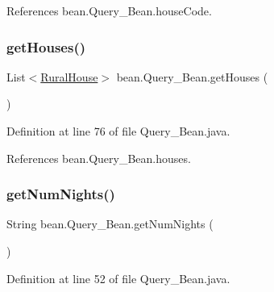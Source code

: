References bean.\+Query\+\_\+\+Bean.\+house\+Code.

\mbox{\label{classbean_1_1Query__Bean_aefdbf74a5f2ddbf5b047f5ad56245de5}} 
\subsubsection{\texorpdfstring{getHouses()}{getHouses()}}
{\footnotesize\ttfamily List$<$\mbox{\hyperlink{classdomain_1_1RuralHouse}{Rural\+House}}$>$ bean.\+Query\+\_\+\+Bean.\+get\+Houses (\begin{DoxyParamCaption}{ }\end{DoxyParamCaption})}



Definition at line 76 of file Query\+\_\+\+Bean.\+java.


\begin{DoxyCode}{0}

\end{DoxyCode}


References bean.\+Query\+\_\+\+Bean.\+houses.

\mbox{\label{classbean_1_1Query__Bean_ab979d29b59d31df3848b6a2420cbbc70}} 
\subsubsection{\texorpdfstring{getNumNights()}{getNumNights()}}
{\footnotesize\ttfamily String bean.\+Query\+\_\+\+Bean.\+get\+Num\+Nights (\begin{DoxyParamCaption}{ }\end{DoxyParamCaption})}



Definition at line 52 of file Query\+\_\+\+Bean.\+java.


\begin{DoxyCode}{0}

\end{DoxyCode}


